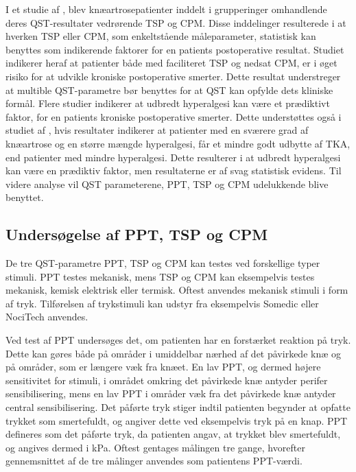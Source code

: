 I et studie af , blev knæartrosepatienter inddelt i grupperinger omhandlende deres QST-resultater vedrørende TSP og CPM. Disse inddelinger resulterede i at hverken TSP eller CPM, som enkeltstående måleparameter, statistisk kan benyttes som indikerende faktorer for en patients postoperative resultat. Studiet indikerer heraf at patienter både med faciliteret TSP og nedsat CPM, er i øget risiko for at udvikle kroniske postoperative smerter. Dette resultat understreger at multible QST-parametre bør benyttes for at QST kan opfylde dets kliniske formål. \citep{Petersen2016} Flere studier indikerer at udbredt hyperalgesi kan være et prædiktivt faktor, for en patients kroniske postoperative smerter. \citep{Petersen2016} \citep{Wylde2013} Dette understøttes også i studiet af , hvis resultater indikerer at patienter med en sværere grad af knæartrose og en større mængde hyperalgesi, får et mindre godt udbytte af TKA, end patienter med mindre hyperalgesi. Dette resulterer i at udbredt hyperalgesi kan være en prædiktiv faktor, men resultaterne er af svag statistisk evidens. \citep{Wylde2016c}
Til videre analyse vil QST parameterene, PPT, TSP og CPM udelukkende blive benyttet.

\subsection{Undersøgelse af PPT, TSP og CPM}
De tre QST-parametre PPT, TSP og CPM kan testes ved forskellige typer stimuli. PPT testes mekanisk, mens TSP og CPM kan eksempelvis testes mekanisk, kemisk elektrisk eller termisk. Oftest anvendes mekanisk stimuli i form af tryk. \citep{Suokas2012} \citep{Yarnitsky2006} Tilførelsen af trykstimuli kan udstyr fra eksempelvis Somedic eller NociTech anvendes. \citep{Wylde2015b} \citep{Petersen2016} 

Ved test af PPT undersøges det, om patienten har en forstærket reaktion på tryk. Dette kan gøres både på områder i umiddelbar nærhed af det påvirkede knæ og på områder, som er længere væk fra knæet. En lav PPT, og dermed højere sensitivitet for stimuli, i området omkring det påvirkede knæ antyder perifer sensibilisering, mens en lav PPT i områder væk fra det påvirkede knæ antyder central sensibilisering. \citep{Suokas2012} Det påførte tryk stiger indtil patienten begynder at opfatte trykket som smertefuldt, og angiver dette ved eksempelvis tryk på en knap. PPT defineres som det påførte tryk, da patienten angav, at trykket blev smertefuldt, og angives dermed i kPa. Oftest gentages målingen tre gange, hvorefter gennemsnittet af de tre målinger anvendes som patientens PPT-værdi. \citep{Petersen2015} \citep{Wylde2015b} 

